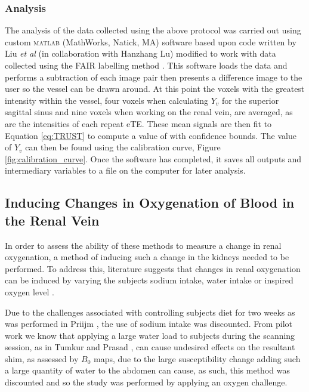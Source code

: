 \subsubsection{Analysis}
\label{sec:trust_analysis}
The analysis of the data collected using the above protocol was carried out using custom \textsc{matlab} (MathWorks, Natick, MA) software based upon code written by Liu \textit{et al} (in collaboration with Hanzhang Lu) modified to work with data collected using the \ac{FAIR} labelling method \cite{liu_pro_2011}. This software loads the data and performs a subtraction of each image pair then presents a difference image to the user so the vessel can be drawn around. At this point the voxels with the greatest intensity within the vessel, four voxels when calculating $Y_v$ for the superior sagittal sinus and nine voxels when working on the renal vein, are averaged, as are the intensities of each repeat \ac{eTE}. These mean signals are then fit to Equation \eqref{eq:TRUST} to compute a value of \ttwo with confidence bounds. The value of $Y_v$ can then be found using the calibration curve, Figure \ref{fig:calibration_curve}. Once the software has completed, it saves all outputs and intermediary variables to a file on the computer for later analysis.

\subsection{Inducing Changes in Oxygenation of Blood in the Renal Vein}

In order to assess the ability of these methods to measure a change in renal oxygenation, a method of inducing such a change in the kidneys needed to be performed. To address this, literature suggests that changes in renal oxygenation can be induced by varying the subjects sodium intake, water intake or inspired oxygen level \cite{oconnor_comparison_2009, donati_quantitative_2012}.

Due to the challenges associated with controlling subjects diet for two weeks as was performed in Priijm \cite{pruijm_effect_2010}, the use of sodium intake was discounted. From pilot work we know that applying a large water load to subjects during the scanning session, as in Tumkur and Prasad  \cite{tumkur_evaluation_2006, prasad_changes_1999}, can cause undesired effects on the resultant shim, as assessed by $B_0$ maps, due to the large susceptibility change adding such a large quantity of water to the abdomen can cause, as such, this method was discounted and so the study was performed by applying an oxygen challenge.

